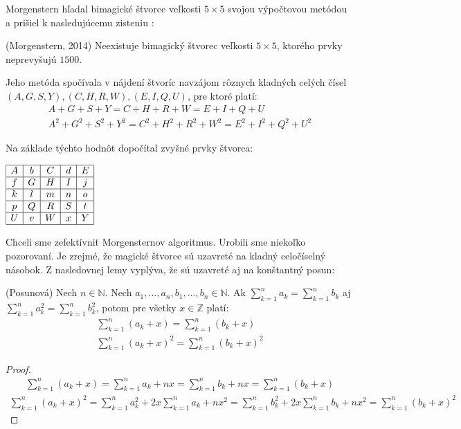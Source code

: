 Morgenstern hľadal bimagické štvorce veľkosti $5 \times 5$ svojou výpočtovou metódou a prišiel k nasledujúcemu zisteniu \cite{multimagie}:

\begin{theorem} (Morgenstern, 2014) Neexistuje bimagický štvorec veľkosti $5 \times 5$, ktorého prvky neprevyšujú $1500$.
\end{theorem}

Jeho metóda spočívala v nájdení štvoríc navzájom rôznych kladných celých čísel $(A,G,S,Y), (C,H,R,W), (E,I,Q,U)$, pre ktoré platí:
\begin{gather*}
A+G+S+Y = C+H+R+W = E+I+Q+U \\
A^2+G^2+S^2+Y^2 = C^2+H^2+R^2+W^2 = E^2+I^2+Q^2+U^2
\end{gather*}

Na základe týchto hodnôt dopočítal zvyšné prvky štvorca:

\begin{center}
$\begin{array}{ |c|c|c|c|c| }
\hline
A & b & C & d & E \\ 
\hline
f & G & H & I & j  \\ 
\hline
k & l & m & n & o \\ 
\hline
p & Q & R & S & t \\ 
\hline
U & v & W & x & Y \\
\hline
\end{array}$
\end{center}

Chceli sme zefektívniť Morgensternov algoritmus. Urobili sme niekoľko pozorovaní. Je zrejmé, že magické štvorce sú uzavreté na kladný celočíselný násobok. Z nasledovnej lemy vyplýva, že sú uzavreté aj na konštantný posun:

\begin{lemma} (Posunová) Nech $n \in \mathbb{N}$. Nech $a_1, \dots , a_n, b_1, \dots , b_n \in \mathbb{N}$. Ak $\sum_{k=1}^{n} a_k = \sum_{k=1}^{n} b_k$ aj $\sum_{k=1}^{n} a^2_k = \sum_{k=1}^{n} b^2_k$, potom pre všetky $x \in \mathbb{Z}$ platí:
\begin{gather*}
\sum_{k=1}^{n} (a_k + x) = \sum_{k=1}^{n} (b_k + x) \\
\sum_{k=1}^{n} (a_k + x)^2 = \sum_{k=1}^{n} (b_k + x)^2
\end{gather*}
\end{lemma}
 
\begin{proof}
\begin{gather*}
\sum_{k=1}^{n} (a_k + x) = \sum_{k=1}^{n} a_k + nx = \sum_{k=1}^{n} b_k + nx = \sum_{k=1}^{n} (b_k + x)
\end{gather*}
\begin{gather*}
\sum_{k=1}^{n} (a_k + x)^2 = \sum_{k=1}^{n} a^2_k + 2x \sum_{k=1}^{n} a_k + nx^2 = \sum_{k=1}^{n} b^2_k + 2x \sum_{k=1}^{n} b_k + nx^2 = \sum_{k=1}^{n} (b_k + x)^2
\end{gather*}
\end{proof}

